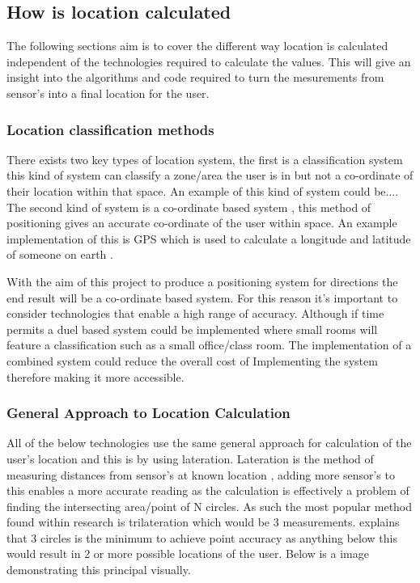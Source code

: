 \subsection{How is location calculated}
The following sections aim is to cover the different way location is calculated independent of the technologies required to calculate the values. This will give an insight into the algorithms and code required to turn the mesurements from sensor's into a final location for the user. 

\subsubsection{Location classification methods}
There exists two key types of location system, the first is a classification system \citetemp this kind of system can classify a zone/area the user is in but not a co-ordinate of their location within that space. An example of this kind of system could be....
The second kind of system is a co-ordinate based system \citetemp, this method of positioning gives an accurate co-ordinate of the user within space. An example implementation of this is GPS which is used to calculate a longitude and latitude of someone on earth \citetemp.

With the aim of this project to produce a positioning system for directions the end result will be a co-ordinate based system. For this reason it's important to consider technologies that enable a high range of accuracy. Although if time permits a duel based system could be implemented where small rooms will feature a classification such as a small office/class room. The implementation of a combined system could reduce the overall cost of Implementing the system therefore making it more accessible.

\subsubsection{General Approach to Location Calculation}
All of the below technologies use the same general approach for calculation of the user's location and this is by using lateration. Lateration is the method of measuring distances from sensor's at known location \citetemp, adding more sensor's to this enables a more accurate reading as the calculation is effectively a problem of finding the intersecting area/point of N circles. As such the most popular method found within research is trilateration which would be 3 measurements. \citetemp explains that 3 circles is the minimum to achieve point accuracy as anything below this would result in 2 or more possible locations of the user. Below is a image demonstrating this principal visually.

